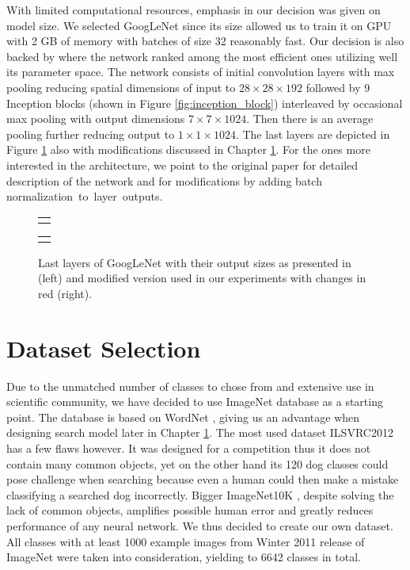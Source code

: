 With limited computational resources, emphasis in our decision was given on model size. We selected GoogLeNet since its size allowed us to train it on GPU with 2 GB of memory with batches of size 32 reasonably fast. Our decision is also backed by \cite{ModelSizes2016} where the network ranked among the most efficient ones utilizing well its parameter space. The network consists of initial convolution layers with max pooling reducing spatial dimensions of input to $28\times 28\times 192$ followed by 9 Inception blocks (shown in Figure \ref{fig:inception_block}) interleaved by occasional max pooling with output dimensions $7\times 7\times 1024$. Then there is an average pooling further reducing output to $1\times 1\times 1024$. The last layers are depicted in Figure \ref{fig:inception_end} also with modifications discussed in Chapter \ref{}. For the ones more interested in the architecture, we point to the original paper \cite{szegedy2015going} for detailed description of the network and \cite{ioffe2015batch} for modifications by adding batch normalization~to~layer~outputs.



\begin{figure}
	\centering
	
	\begin{tabular}{@{}c@{}}
		\subfloat{
			
		}
	\end{tabular}
	\begin{tabular}{@{}c@{}}
		\subfloat{
			
		}
	\end{tabular}
	
	\caption[Last layers of GoogLeNet]{Last layers of GoogLeNet with their output sizes as presented in \cite{szegedy2015going} (left) and modified version used in our experiments with changes in red (right).}
	\label{fig:inception_end}
\end{figure}



\section{Dataset Selection}
Due to the unmatched number of classes to chose from and extensive use in scientific community, we have decided to use ImageNet database \cite{ILSVRC15} as a starting point. The database is based on WordNet \cite{WordNet}, giving us an advantage when designing search model later in Chapter \ref{}. The most used dataset ILSVRC2012 has a few flaws however. It was designed for a competition thus it does not contain many common objects, yet on the other hand its 120 dog classes could pose challenge when searching because even a human could then make a mistake classifying a searched dog incorrectly. Bigger ImageNet10K \cite{deng2010does}, despite solving the lack of common objects, amplifies possible human error and greatly reduces performance of any neural network. We thus decided to create our own dataset. All classes with at least 1000 example images from Winter 2011 release of ImageNet were taken into consideration, yielding to 6642 classes in total.

